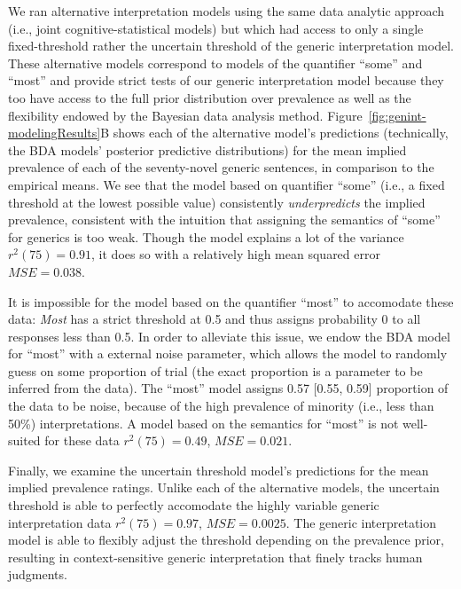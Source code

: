 \documentclass[floatsintext,man]{apa6}
\theoremstyle{definition}
\theoremstyle{definition}
\theoremstyle{definition}
\theoremstyle{remark}
\begin{document}
We ran alternative interpretation models using the same data analytic
approach (i.e., joint cognitive-statistical models) but which had access
to only a single fixed-threshold rather the uncertain threshold of the
generic interpretation model. These alternative models correspond to
models of the quantifier \enquote{some} and \enquote{most} and provide
strict tests of our generic interpretation model because they too have
access to the full prior distribution over prevalence as well as the
flexibility endowed by the Bayesian data analysis method.
Figure~\ref{fig:genint-modelingResults}B shows each of the alternative
model's predictions (technically, the BDA models' posterior predictive
distributions) for the mean implied prevalence of each of the
seventy-novel generic sentences, in comparison to the empirical means.
We see that the model based on quantifier \enquote{some} (i.e., a fixed
threshold at the lowest possible value) consistently
\emph{underpredicts} the implied prevalence, consistent with the
intuition that assigning the semantics of \enquote{some} for generics is
too weak. Though the model explains a lot of the variance
\(r^2(75) = 0.91\), it does so with a relatively high mean squared error
\(MSE = 0.038\).

It is impossible for the model based on the quantifier \enquote{most} to
accomodate these data: \emph{Most} has a strict threshold at 0.5 and
thus assigns probability 0 to all responses less than 0.5. In order to
alleviate this issue, we endow the BDA model for \enquote{most} with a
external noise parameter, which allows the model to randomly guess on
some proportion of trial (the exact proportion is a parameter to be
inferred from the data). The \enquote{most} model assigns 0.57 {[}0.55,
0.59{]} proportion of the data to be noise, because of the high
prevalence of minority (i.e., less than 50\%) interpretations. A model
based on the semantics for \enquote{most} is not well-suited for these
data \(r^2(75) = 0.49\), \(MSE = 0.021\).

Finally, we examine the uncertain threshold model's predictions for the
mean implied prevalence ratings. Unlike each of the alternative models,
the uncertain threshold is able to perfectly accomodate the highly
variable generic interpretation data \(r^2(75) = 0.97\),
\(MSE = 0.0025\). The generic interpretation model is able to flexibly
adjust the threshold depending on the prevalence prior, resulting in
context-sensitive generic interpretation that finely tracks human
judgments.
\end{document}
